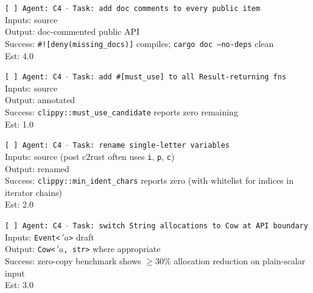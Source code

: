 \documentclass[12pt]{article}
\theoremstyle{definition}
\theoremstyle{remark}
\newcommand{\lifetime}[1]{\ensuremath{\,'\!#1}}
\begin{document}
\begin{small}
\noindent\texttt{[ ] Agent: C4 $\cdot$ Task: add doc comments to every public item}\\
\hspace*{2em}Inputs: source\\
\hspace*{2em}Output: doc-commented public API\\
\hspace*{2em}Success: \texttt{\#![deny(missing\_docs)]} compiles; \texttt{cargo doc --no-deps} clean\\
\hspace*{2em}Est: 4.0

\noindent\texttt{[ ] Agent: C4 $\cdot$ Task: add \#[must\_use] to all Result-returning fns}\\
\hspace*{2em}Inputs: source\\
\hspace*{2em}Output: annotated\\
\hspace*{2em}Success: \texttt{clippy::must\_use\_candidate} reports zero remaining\\
\hspace*{2em}Est: 1.0

\noindent\texttt{[ ] Agent: C4 $\cdot$ Task: rename single-letter variables}\\
\hspace*{2em}Inputs: source (post c2rust often uses \texttt{i}, \texttt{p}, \texttt{c})\\
\hspace*{2em}Output: renamed\\
\hspace*{2em}Success: \texttt{clippy::min\_ident\_chars} reports zero (with whitelist for indices in iterator chains)\\
\hspace*{2em}Est: 2.0

\noindent\texttt{[ ] Agent: C4 $\cdot$ Task: switch String allocations to Cow at API boundary}\\
\hspace*{2em}Inputs: \texttt{Event<\lifetime{a}>} draft\\
\hspace*{2em}Output: \texttt{Cow<\lifetime{a}, str>} where appropriate\\
\hspace*{2em}Success: zero-copy benchmark shows $\geq 30\%$ allocation reduction on plain-scalar input\\
\hspace*{2em}Est: 3.0


\end{small}
\end{document}
